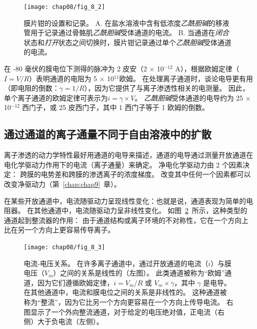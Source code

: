 \begin{figure}[htbp]
	\centering
	\texttt{[image: chap08/fig\_8\_2]}
	\caption{膜片钳的设置和记录。
	A. 在盐水溶液中含有低浓度\textit{乙酰胆碱}的移液管用于记录通过骨骼肌\textit{乙酰胆碱}受体通道的电流\cite{alberts2017molecular}。
	B. 当通道在\textit{闭合}状态和\textit{打开}状态之间切换时，膜片钳记录通过单个\textit{乙酰胆碱}受体通道的电流。}
	\label{fig:8_2}
\end{figure}



在 -80 毫伏的膜电位下测得的脉冲为 2 皮安（2 $\times$ 10$^{-12}$ A），根据欧姆定律（$I = V/R$）表明通道的电阻为 5 $\times$ 10$^{11}$欧姆。
在处理离子通道时，谈论电导更有用（即电阻的倒数：$\gamma = 1/R$），因为它提供了与离子渗透性相关的电测量。
因此，单个离子通道的欧姆定律可表示为$i=\gamma \times V$。
\textit{乙酰胆碱}受体通道的电导约为 25 $\times$ 10$^{-12}$ 西门子，或 25 皮西门子，其中 1 西门子等于 1 欧姆的倒数。



\subsection{通过通道的离子通量不同于自由溶液中的扩散}

离子渗透的动力学特性最好用通道的电导来描述，通道的电导通过测量开放通道在电化学驱动力作用下的电流（离子通量）来确定。
净电化学驱动力由 2 个因素决定：
跨膜的电势差和跨膜的渗透离子的浓度梯度。
改变其中任何一个因素都可以改变净驱动力（第~\ref{chap:chap9}~章）。


在某些开放通道中，电流随驱动力呈现线性变化：也就是说，通道表现为简单的电阻器。
在其他通道中，电流随驱动力呈非线性变化。
如图~\ref{fig:8_3}~所示，这种类型的通道起到整流器的作用：
由于通道结构或离子环境的不对称性，它在一个方向上比在另一个方向上更容易传导离子。


\begin{figure}[htbp]
	\centering
	\texttt{[image: chap08/fig\_8\_3]}
	\caption{电流-电压关系。
		在许多离子通道中，通过开放通道的电流（$i$）与膜电压（$V_m$）之间的关系是线性的（左图）。
		此类通道被称为“欧姆”通道，因为它们遵循欧姆定律，$i = V_m /R$ 或 $ V_m \times \gamma $，其中 $\gamma$ 是电导。
		在其他通道中，电流和膜电位之间的关系是非线性的。
		这种通道被称为“整流”，因为它比另一个方向更容易在一个方向上传导电流。
		右图显示了一个外向整流通道，对于给定的电压绝对值，正电流（右侧）大于负电流（左侧）。}
	\label{fig:8_3}
\end{figure}


